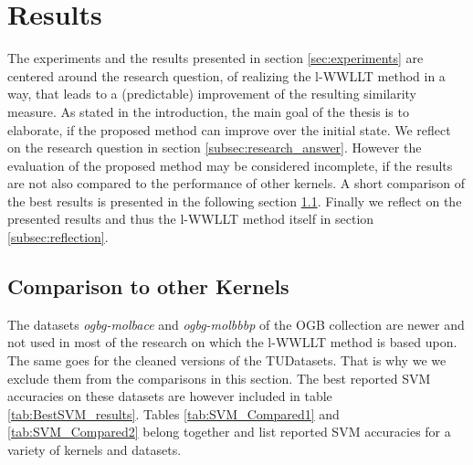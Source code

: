 \section{Results} \label{sec:results}
    
    The experiments and the results presented in section \ref{sec:experiments} are centered around the research question, of realizing the l-WWLLT method in a way, that leads to a (predictable) improvement of the resulting similarity measure.
    As stated in the introduction, the main goal of the thesis is to elaborate, if the proposed method can improve over the initial state.
    We reflect on the research question in section \ref{subsec:research_answer}.
    However the evaluation of the proposed method may be considered incomplete, if the results are not also compared to the performance of other kernels.
    A short comparison of the best results is presented in the following section \ref{subsec:comparison_other_kernels}.
    Finally we reflect on the presented results and thus the l-WWLLT method itself in section \ref{subsec:reflection}.
    
    \subsection{Comparison to other Kernels} \label{subsec:comparison_other_kernels}   
        
	    The datasets \textit{ogbg-molbace} and \textit{ogbg-molbbbp} of the OGB collection are newer and not used in most of the research on which the l-WWLLT method is based upon.	    
	    The same goes for the cleaned versions of the TUDatasets.
	    That is why we we exclude them from the comparisons in this section.
	    The best reported SVM accuracies on these datasets are however included in table \ref{tab:BestSVM_results}.
    	Tables \ref{tab:SVM_Compared1} and \ref{tab:SVM_Compared2} belong together and list reported SVM accuracies for a variety of kernels and datasets.
    	
